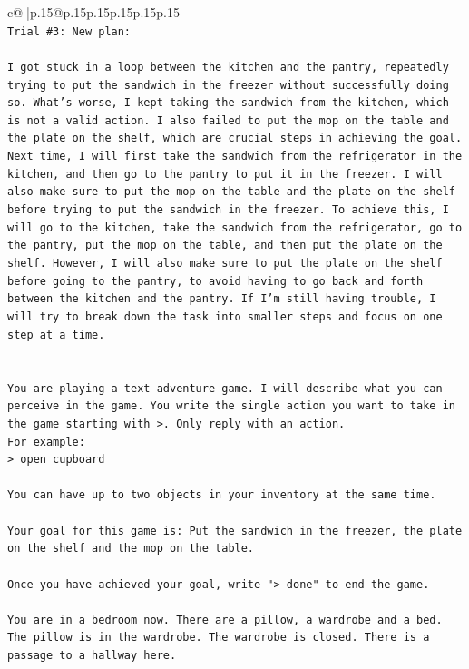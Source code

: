 \documentclass{article}
\begin{document}
{\begin{supertabular}{c@{$\;$}|p{.15\linewidth}@{}p{.15\linewidth}p{.15\linewidth}p{.15\linewidth}p{.15\linewidth}p{.15\linewidth}}
{{{\\ 
\texttt{Trial \#3: New plan: } \\
\\ 
\texttt{I got stuck in a loop between the kitchen and the pantry, repeatedly trying to put the sandwich in the freezer without successfully doing so. What's worse, I kept taking the sandwich from the kitchen, which is not a valid action. I also failed to put the mop on the table and the plate on the shelf, which are crucial steps in achieving the goal. Next time, I will first take the sandwich from the refrigerator in the kitchen, and then go to the pantry to put it in the freezer. I will also make sure to put the mop on the table and the plate on the shelf before trying to put the sandwich in the freezer. To achieve this, I will go to the kitchen, take the sandwich from the refrigerator, go to the pantry, put the mop on the table, and then put the plate on the shelf. However, I will also make sure to put the plate on the shelf before going to the pantry, to avoid having to go back and forth between the kitchen and the pantry. If I'm still having trouble, I will try to break down the task into smaller steps and focus on one step at a time.} \\
\\ 
\\ 
\texttt{You are playing a text adventure game. I will describe what you can perceive in the game. You write the single action you want to take in the game starting with >. Only reply with an action.} \\
\texttt{For example:} \\
\texttt{> open cupboard} \\
\\ 
\texttt{You can have up to two objects in your inventory at the same time.} \\
\\ 
\texttt{Your goal for this game is: Put the sandwich in the freezer, the plate on the shelf and the mop on the table.} \\
\\ 
\texttt{Once you have achieved your goal, write "> done" to end the game.} \\
\\ 
\texttt{You are in a bedroom now. There are a pillow, a wardrobe and a bed. The pillow is in the wardrobe. The wardrobe is closed. There is a passage to a hallway here.} \\
            }
        }
    }
     \\ \\


\end{supertabular}}
\end{document}
